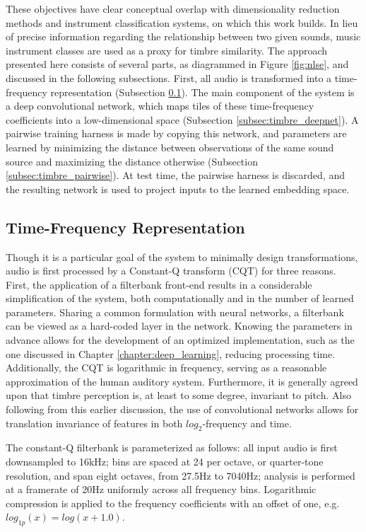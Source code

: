 These objectives have clear conceptual overlap with dimensionality reduction methods and instrument classification systems, on which this work builds.
In lieu of precise information regarding the relationship between two given sounds, music instrument classes are used as a proxy for timbre similarity.
The approach presented here consists of several parts, as diagrammed in Figure \ref{fig:nlse}, and discussed in the following subsections.
First, all audio is transformed into a time-frequency representation (Subsection \ref{subsec:timbre_tfr}).
The main component of the system is a deep convolutional network, which maps tiles of these time-frequency coefficients into a low-dimensional space (Subsection \ref{subsec:timbre_deepnet}).
A pairwise training harness is made by copying this network, and parameters are learned by minimizing the distance between observations of the same sound source and maximizing the distance otherwise (Subsection \ref{subsec:timbre_pairwise}).
At test time, the pairwise harness is discarded, and the resulting network is used to project inputs to the learned embedding space.


\subsection{Time-Frequency Representation}
\label{subsec:timbre_tfr}

Though it is a particular goal of the system to minimally design transformations, audio is first processed by a Constant-Q transform (CQT) for three reasons.
First, the application of a filterbank front-end results in a considerable simplification of the system, both computationally and in the number of learned parameters.
Sharing a common formulation with neural networks, a filterbank can be viewed as a hard-coded layer in the network.
Knowing the parameters in advance allows for the development of an optimized implementation, such as the one discussed in Chapter \ref{chapter:deep_learning}, reducing processing time.
Additionally, the CQT is logarithmic in frequency, serving as a reasonable approximation of the human auditory system.
Furthermore, it is generally agreed upon that timbre perception is, at least to some degree, invariant to pitch.
Also following from this earlier discussion, the use of convolutional networks allows for translation invariance of features in both $log_2$-frequency and time.

The constant-Q filterbank is parameterized as follows: all input audio is first downsampled to 16kHz; bins are spaced at 24 per octave, or quarter-tone resolution, and span eight octaves, from 27.5Hz to 7040Hz; analysis is performed at a framerate of 20Hz uniformly across all frequency bins.
Logarithmic compression is applied to the frequency coefficients with an offset of one, e.g. $log_{1p}(x) = log(x + 1.0)$.


